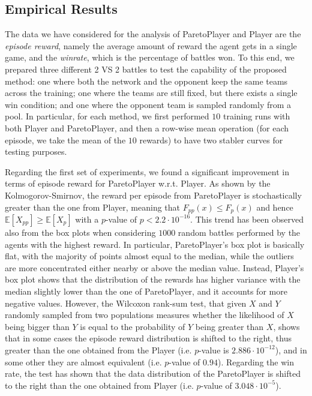 \subsection{Empirical Results}
The data we have considered for the analysis of ParetoPlayer and Player are the \emph{episode reward}, namely the average amount of reward the agent gets in a single game, and the \emph{winrate}, which is the percentage of battles won. To this end, we prepared three different 2 VS 2 battles to test the capability of the proposed method: one where both the network and the opponent keep the same teams across the training; one where the teams are still fixed, but there exists a single win condition; and one where the opponent team is sampled randomly from a pool. In particular, for each method, we first performed $10$ training runs with both Player and ParetoPlayer, and then a row-wise mean operation (for each episode, we take the mean of the $10$ rewards) to have two stabler curves for testing purposes.

Regarding the first set of experiments, we found a significant improvement in terms of episode reward for ParetoPlayer w.r.t. Player. As shown by the Kolmogorov-Smirnov, the reward per episode from ParetoPlayer is stochastically greater than the one from Player, meaning that $F_{pp}(x) \leq F_p(x)$ and hence $\mathbb{E}[X_{pp}] \geq \mathbb{E}[X_p] $ with a $p$-value of $p < 2.2 \cdot 10^{-16}$. This trend has been observed also from the box plots when considering $1000$ random battles performed by the agents with the highest reward. In particular, ParetoPlayer's box plot is basically flat, with the majority of points almost equal to the median, while the outliers are more concentrated either nearby or above the median value. Instead, Player's box plot shows that the distribution of the rewards has higher variance with the median slightly lower than the one of ParetoPlayer, and it accounts for more negative values. However, the Wilcoxon rank-sum test, that given $X$ and $Y$ randomly sampled from two populations measures whether the likelihood of $X$ being bigger than $Y$ is equal to the probability of $Y$ being greater than $X$, shows that in some cases the episode reward distribution is shifted to the right, thus greater than the one obtained from the Player (i.e. $p$-value is $2.886 \cdot 10^{-12}$), and in some other they are almost equivalent (i.e. $p$-value of $0.94$). Regarding the win rate, the test has shown that the data distribution of the ParetoPlayer is shifted to the right than the one obtained from Player (i.e. $p$-value of $3.048 \cdot 10^{-5}$).

